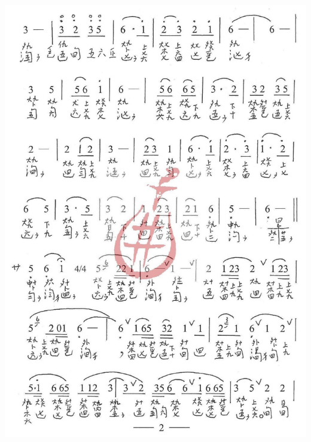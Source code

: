 \documentclass[cn,pad,twocol]{elegantbook}
\begin{document}
\paragraph*{\includegraphics[width=\textwidth]{mudanting/2021-牡丹亭-02游园}} 
\end{document}
